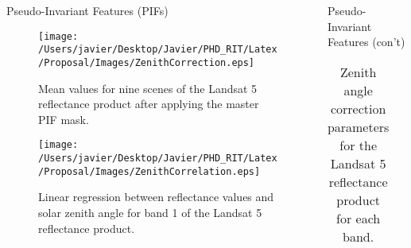 \documentclass{beamer}
\begin{document}
\begin{frame}{}
\begin{columns}[t]
\begin{column}{.3\linewidth}
\begin{block}{Pseudo-Invariant Features (PIFs)}
\begin{figure}[!ht]
  \begin{minipage}[c]{0.48\linewidth}
  	\centering
  	\texttt{[image: /Users/javier/Desktop/Javier/PHD\_RIT/Latex/Proposal/Images/ZenithCorrection.eps]}
  \caption{Mean values for nine scenes of the Landsat 5 reflectance product after applying the master PIF mask. \label{fig:ZenithCorr} } 
  \end{minipage}
  \hfill
  \begin{minipage}[d]{0.48\linewidth}
  	\centering
  	\texttt{[image: /Users/javier/Desktop/Javier/PHD\_RIT/Latex/Proposal/Images/ZenithCorrelation.eps]}
  \caption{Linear regression between reflectance values and solar zenith angle for band 1 of the Landsat 5 reflectance product. \label{fig:Band1Corr} } 
   \end{minipage}
\end{figure}

\end{block} 
\end{column}
 \begin{column}{.3\linewidth}
\begin{block}{Pseudo-Invariant Features (con't)}
\begin{table}[!ht]
\caption{ Zenith angle correction parameters for the Landsat 5 reflectance product for each band. \label{tab:ZenithCorr} } 
\centering
\scriptsize
\begin{tabular}{l|c|c|c|c|c} 


\end{tabular}
\end{table}
\end{block}
\end{column}
\end{columns}
\end{frame}
\end{document}
